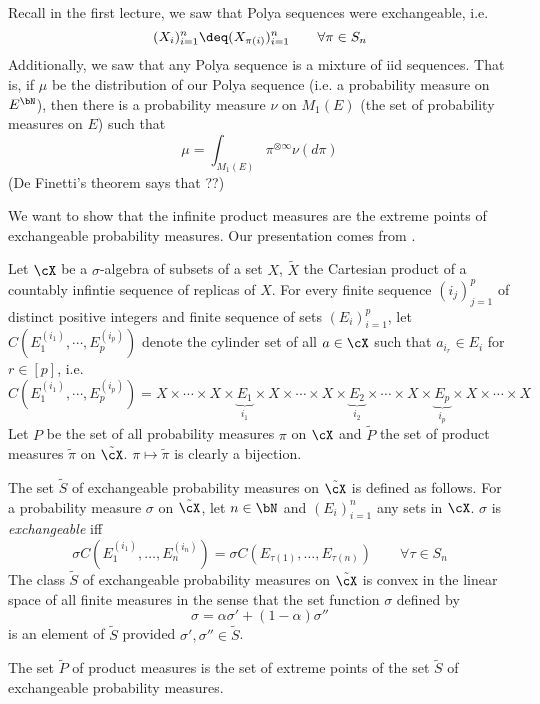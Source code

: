 Recall in the first lecture, we saw that Polya sequences were exchangeable,
i.e.
\[
  (X_{i})_{i=1}^n \deq (X_{\pi(i)})_{i=1}^n\qquad \forall \pi \in S_n
\]
Additionally, we saw that any Polya sequence is a mixture of iid sequences.
That is, if $\mu$ be the distribution of our Polya sequence (i.e. a probability
measure on $E^{\bN}$), then there is a probability measure $\nu$ on $M_1(E)$
(the set of probability measures on $E$) such that
\[
  \mu = \int_{M_1(E)} \pi^{\otimes \infty} \nu(d\pi)
\]
(De Finetti's theorem says that ??)

We want to show that the infinite product measures are the extreme points of
exchangeable probability measures. Our presentation comes from
\cite{hewitt1955symmetric}.


Let $\cX$ be a $\sigma$-algebra of subsets of a set $X$,
$\tilde{X}$ the Cartesian product of a countably infintie sequence of replicas
of $X$. For every finite sequence $(i_j)_{j=1}^p$ of distinct
positive integers and finite sequence of sets $(E_i)_{i=1}^p$,
let $C(E_1^{(i_1)}, \cdots, E_p^{(i_p)})$
denote the cylinder set of all $a \in \cX$ such that $a_{i_r} \in E_i$
for $r \in [p]$, i.e.
\[
  C(E_1^{(i_1)}, \cdots, E_p^{(i_p)})
  = X \times \cdots \times X \times \underbrace{E_1}_{i_1} \times
  X \times \cdots \times X \times \underbrace{E_2}_{i_2} \times \cdots
  \times X \times \underbrace{E_p}_{i_p} \times X \times \cdots \times X
\]
Let $P$ be the set of all probability measures $\pi$ on $\cX$
and $\tilde{P}$ the set of product measures $\tilde{\pi}$ on $\tilde{\cX}$.
$\pi \mapsto \tilde{\pi}$ is clearly a bijection.

The set $\tilde{S}$ of exchangeable probability measures on $\tilde{\cX}$
is defined as follows. For a probability measure $\sigma$ on $\tilde{\cX}$,
let $n \in \bN$ and $(E_i)_{i=1}^n$ any sets in $\cX$.
$\sigma$ is \emph{exchangeable} iff
\[
  \sigma C(E_1^{(i_1)},\ldots, E_n^{(i_n)}) = \sigma C( E_{\tau(1)}, \ldots, E_{\tau(n)} )
  \qquad \forall \tau \in S_n
\]
The class $\tilde{S}$ of exchangeable probability measures on $\tilde{\cX}$ is
convex in the linear space of all finite measures in the sense that the set
function $\sigma$ defined by
\[
  \sigma = \alpha \sigma' + (1 - \alpha) \sigma''
\]
is an element of $\tilde{S}$ provided $\sigma', \sigma'' \in \tilde{S}$.

\begin{theorem}
  The set $\tilde{P}$ of product measures is the set of extreme points of the
  set $\tilde{S}$ of exchangeable probability measures.
\end{theorem}

